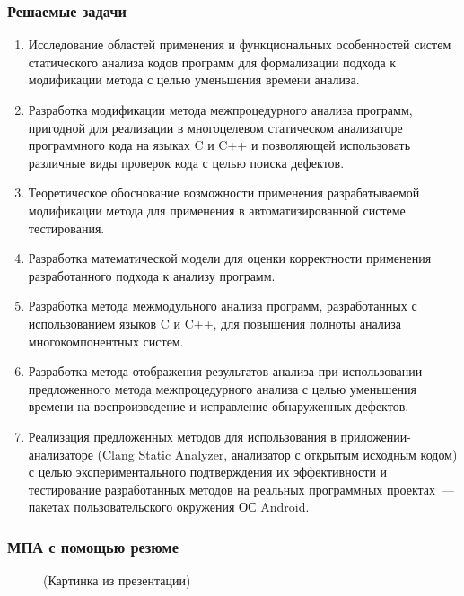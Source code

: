 \documentclass[hyperref={pdfpagelabels=false}]{beamer}
\begin{document}
\begin{frame}[allowframebreaks]
\frametitle{Решаемые задачи}

\begin{enumerate}
  \item Исследование областей применения и функциональных особенностей систем статического анализа кодов программ для формализации подхода к модификации метода с целью уменьшения времени анализа.
  \item Разработка модификации метода межпроцедурного анализа программ, пригодной для реализации в многоцелевом статическом анализаторе программного кода на языках C и C++ и позволяющей использовать различные виды проверок кода с целью поиска дефектов.
  \item Теоретическое обоснование возможности применения разрабатываемой модификации метода для применения в автоматизированной системе тестирования.
  \item Разработка математической модели для оценки корректности применения разработанного подхода к анализу программ.
  \item Разработка метода межмодульного анализа программ, разработанных с использованием языков C и C++, для повышения полноты анализа многокомпонентных систем.
  \item Разработка метода отображения результатов анализа при использовании предложенного метода межпроцедурного анализа с целью уменьшения времени на воспроизведение и исправление обнаруженных дефектов.
  \item Реализация предложенных методов для использования в приложении-анализаторе (Clang Static Analyzer, анализатор с открытым исходным кодом) с целью экспериментального подтверждения их эффективности и тестирование разработанных методов на реальных программных проектах~--- пакетах пользовательского окружения ОС Android.
\end{enumerate}

\end{frame}

\begin{frame}
\frametitle{МПА с помощью резюме}
\begin{figure}[h]
(Картинка из презентации)
\end{figure}
\end{frame}
\end{document}
